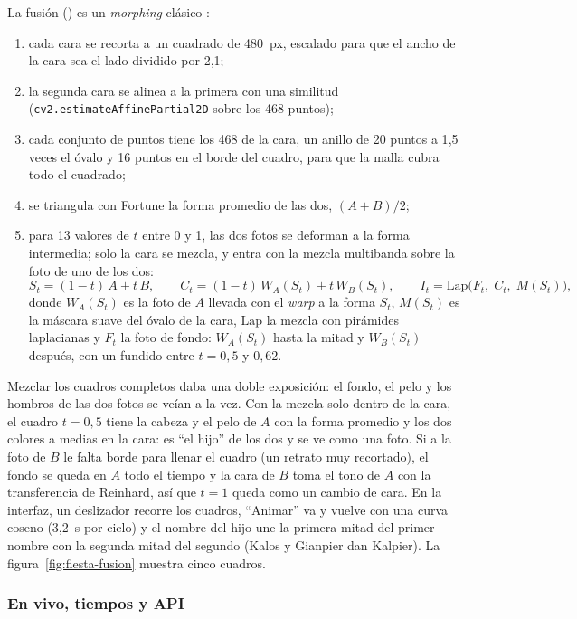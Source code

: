 La fusión () es un \emph{morphing} clásico \cite{beier1992,wolberg1998}:
\begin{enumerate}
  \item cada cara se recorta a un cuadrado de 480~px, escalado para que el ancho de la cara sea el lado dividido por 2{,}1;
  \item la segunda cara se alinea a la primera con una similitud (\texttt{cv2.estimateAffinePartial2D} sobre los 468 puntos);
  \item cada conjunto de puntos tiene los 468 de la cara, un anillo de 20 puntos a 1{,}5 veces el óvalo y 16 puntos en el borde del cuadro, para que la malla cubra todo el cuadrado;
  \item se triangula con Fortune la forma promedio de las dos, $(A+B)/2$;
  \item para 13 valores de $t$ entre 0 y 1, las dos fotos se deforman a la forma intermedia; solo la cara se mezcla, y entra con la mezcla multibanda sobre la foto de uno de los dos:
  \begin{equation}
    S_t=(1-t)\,A+t\,B,\qquad C_t=(1-t)\,W_A(S_t)+t\,W_B(S_t),\qquad I_t=\mathrm{Lap}\big(F_t,\;C_t,\;M(S_t)\big),
  \end{equation}
  donde $W_A(S_t)$ es la foto de $A$ llevada con el \emph{warp} a la forma $S_t$, $M(S_t)$ es la máscara suave del óvalo de la cara, $\mathrm{Lap}$ la mezcla con pirámides laplacianas y $F_t$ la foto de fondo: $W_A(S_t)$ hasta la mitad y $W_B(S_t)$ después, con un fundido entre $t=0{,}5$ y $0{,}62$.
\end{enumerate}
Mezclar los cuadros completos daba una doble exposición: el fondo, el pelo y los hombros de las dos fotos se veían a la vez. Con la mezcla solo dentro de la cara, el cuadro $t=0{,}5$ tiene la cabeza y el pelo de $A$ con la forma promedio y los dos colores a medias en la cara: es ``el hijo'' de los dos y se ve como una foto. Si a la foto de $B$ le falta borde para llenar el cuadro (un retrato muy recortado), el fondo se queda en $A$ todo el tiempo y la cara de $B$ toma el tono de $A$ con la transferencia de Reinhard, así que $t=1$ queda como un cambio de cara. En la interfaz, un deslizador recorre los cuadros, ``Animar'' va y vuelve con una curva coseno (3{,}2~s por ciclo) y el nombre del hijo une la primera mitad del primer nombre con la segunda mitad del segundo (Kalos y Gianpier dan Kalpier). La figura~\ref{fig:fiesta-fusion} muestra cinco cuadros.

\subsubsection{En vivo, tiempos y API}

